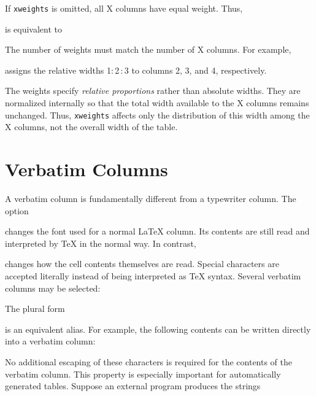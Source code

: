 \documentclass[
11pt,
a4paper,
oneside
]{scrbook}
\begin{document}
If \texttt{xweights} is omitted, all X columns have equal weight. Thus,




is equivalent to





The number of weights must match the number of X columns. For example,




assigns the relative widths 1:\,2\,:\,3 to columns 2, 3, and 4, respectively.

The weights specify \emph{relative proportions} rather than absolute widths.
They are normalized internally so that the total width available to the
X columns remains unchanged. Thus, \texttt{xweights} affects only the
distribution of this width among the X columns, not the overall width of
the table.

\section{Verbatim Columns}

A verbatim column is fundamentally different from a typewriter column.
The option




changes the font used for a normal \LaTeX{} column. Its contents are still
read and interpreted by \TeX{} in the normal way.
In contrast,




changes how the cell contents themselves are read. Special characters are
accepted literally instead of being interpreted as \TeX{} syntax.
Several verbatim columns may be selected:




The plural form




is an equivalent alias.
For example, the following contents can be written directly into a verbatim
column:




No additional escaping of these characters is required for the contents of
the verbatim column.
This property is especially important for automatically generated tables.
Suppose an external program produces the strings
\end{document}
